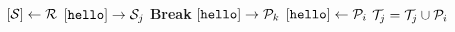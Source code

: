 \documentclass{article}
\begin{document}
\pagestyle{empty}

\newcommand{\send}{\Rightarrow}
\newcommand{\sendto}{\rightarrow}
\algrenewcommand{}

\begin{algorithmic}

  \State $[{\cal S}] \gets {\cal R}$
  \State $[\mathtt{hello}] \sendto {\cal S}_j$
  \State \textbf{Break}
  \EndIf
  \EndFor
  \State $[\mathtt{hello}] \sendto {\cal P}_k$
  \EndFor
  \EndProcedure
  \newline
  \State $[\mathtt{hello}] \gets {\cal P}_i$
  \State ${\cal T}_j = {\cal T}_j \cup {\cal P}_i$
  \EndWhile
  \EndProcedure
  
\end{algorithmic}
\end{document}
